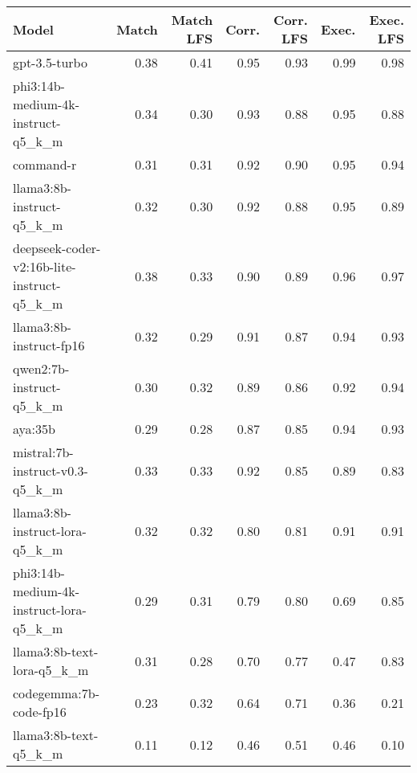 \begin{tabular}{lrrrrrr}
\toprule
Model & Match & Match LFS & Corr. & Corr. LFS & Exec. & Exec. LFS \\
\midrule
gpt-3.5-turbo & 0.38 & 0.41 & 0.95 & 0.93 & 0.99 & 0.98 \\
phi3:14b-medium-4k-instruct-q5\_k\_m & 0.34 & 0.30 & 0.93 & 0.88 & 0.95 & 0.88 \\
command-r & 0.31 & 0.31 & 0.92 & 0.90 & 0.95 & 0.94 \\
llama3:8b-instruct-q5\_k\_m & 0.32 & 0.30 & 0.92 & 0.88 & 0.95 & 0.89 \\
deepseek-coder-v2:16b-lite-instruct-q5\_k\_m & 0.38 & 0.33 & 0.90 & 0.89 & 0.96 & 0.97 \\
llama3:8b-instruct-fp16 & 0.32 & 0.29 & 0.91 & 0.87 & 0.94 & 0.93 \\
qwen2:7b-instruct-q5\_k\_m & 0.30 & 0.32 & 0.89 & 0.86 & 0.92 & 0.94 \\
aya:35b & 0.29 & 0.28 & 0.87 & 0.85 & 0.94 & 0.93 \\
mistral:7b-instruct-v0.3-q5\_k\_m & 0.33 & 0.33 & 0.92 & 0.85 & 0.89 & 0.83 \\
llama3:8b-instruct-lora-q5\_k\_m & 0.32 & 0.32 & 0.80 & 0.81 & 0.91 & 0.91 \\
phi3:14b-medium-4k-instruct-lora-q5\_k\_m & 0.29 & 0.31 & 0.79 & 0.80 & 0.69 & 0.85 \\
llama3:8b-text-lora-q5\_k\_m & 0.31 & 0.28 & 0.70 & 0.77 & 0.47 & 0.83 \\
codegemma:7b-code-fp16 & 0.23 & 0.32 & 0.64 & 0.71 & 0.36 & 0.21 \\
llama3:8b-text-q5\_k\_m & 0.11 & 0.12 & 0.46 & 0.51 & 0.46 & 0.10 \\
\bottomrule
\end{tabular}

